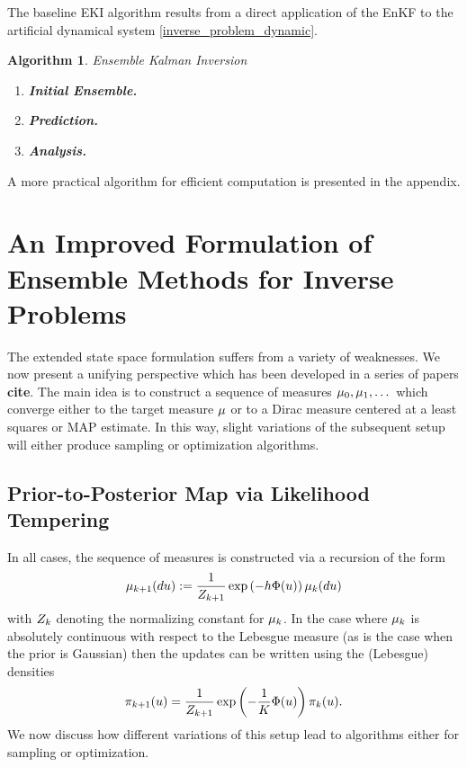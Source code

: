 \documentclass[12pt]{article}
\newtheorem{alg}{Algorithm}
\begin{document}
The baseline EKI algorithm results from a direct application of the EnKF to the artificial dynamical system \ref{inverse_problem_dynamic}. 
\begin{alg} Ensemble Kalman Inversion \\
\begin{enumerate}
\item \textbf{Initial Ensemble.}  
\item \textbf{Prediction.}
\item \textbf{Analysis.} 
\end{enumerate}
\end{alg}
A more practical algorithm for efficient computation is presented in the appendix. 

\section{An Improved Formulation of Ensemble Methods for Inverse Problems}
The extended state space formulation suffers from a variety of weaknesses. We now present a unifying perspective which has been developed 
in a series of papers \textbf{cite}. The main idea is to construct a sequence of measures $\mu_0, \mu_1, \dots$ which converge either 
to the target measure $\mu$ or to a Dirac measure centered at a least squares or MAP estimate. In this way, slight variations of the subsequent
setup will either produce sampling or optimization algorithms. 

\subsection{Prior-to-Posterior Map via Likelihood Tempering}
In all cases, the sequence of measures is constructed via a recursion of the form 
\begin{align} 
\mu_{k+1}(du) := \frac{1}{Z_{k+1}} \exp\left(-h \Phi(u) \right) \mu_{k}(du) \label{measure_recursion}
\end{align}
with $Z_{k}$ denoting the normalizing constant for $\mu_{k}$. In the case where $\mu_{k}$ 
is absolutely continuous with respect to the Lebesgue measure (as is the case 
when the prior is Gaussian) then the updates can be written using the (Lebesgue) densities
\begin{align}
\pi_{k+1}(u) = \frac{1}{Z_{k+1}} \exp\left(-\frac{1}{K} \Phi(u) \right) \pi_{k}(u). 
\end{align}
We now discuss how different variations of this setup lead to algorithms either for sampling or optimization. 
\end{document}
